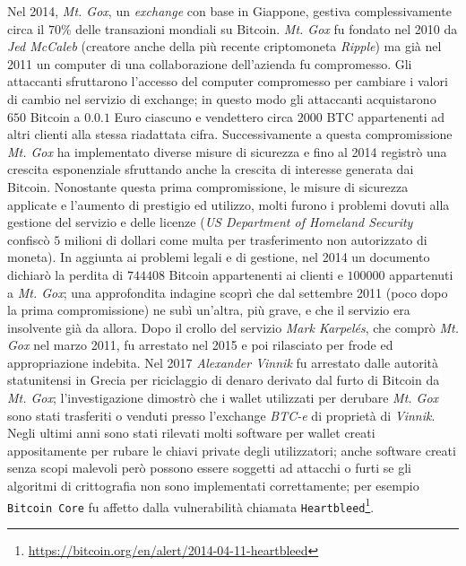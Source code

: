 Nel 2014, \textit{Mt. Gox}, un \textit{exchange} con base in Giappone, gestiva complessivamente circa il $70\%$ delle transazioni mondiali su Bitcoin. \textit{Mt. Gox} fu fondato nel 2010 da \textit{Jed McCaleb} (creatore anche della più recente criptomoneta \textit{Ripple}) ma già nel 2011 un computer di una collaborazione dell'azienda fu compromesso. Gli attaccanti sfruttarono l'accesso del computer compromesso per cambiare i valori di cambio nel servizio di exchange; in questo modo gli attaccanti acquistarono $650$ Bitcoin a $0.0.1$ Euro ciascuno e vendettero circa $2000$ BTC appartenenti ad altri clienti alla stessa riadattata cifra.\newline
Successivamente a questa compromissione \textit{Mt. Gox} ha implementato diverse misure di sicurezza e fino al 2014 registrò una crescita esponenziale sfruttando anche la crescita di interesse generata dai Bitcoin. Nonostante questa prima compromissione, le misure di sicurezza applicate e l'aumento di prestigio ed utilizzo, molti furono i problemi dovuti alla gestione del servizio e delle licenze (\textit{US Department of Homeland Security} confiscò $5$ milioni di dollari come multa per trasferimento non autorizzato di moneta). In aggiunta ai problemi legali e di gestione, nel 2014 un documento dichiarò la perdita di $744408$ Bitcoin appartenenti ai clienti e $100000$ appartenuti a \textit{Mt. Gox}; una approfondita indagine scoprì che dal settembre 2011 (poco dopo la prima compromissione) ne subì un'altra, più grave, e che il servizio era insolvente già da allora. Dopo il crollo del servizio \textit{Mark Karpelés}, che comprò \textit{Mt. Gox} nel marzo 2011, fu arrestato nel 2015 e poi rilasciato per frode ed appropriazione indebita. Nel 2017 \textit{Alexander Vinnik} fu arrestato dalle autorità statunitensi in Grecia per riciclaggio di denaro derivato dal furto di Bitcoin da \textit{Mt. Gox}; l'investigazione dimostrò che i wallet utilizzati per derubare \textit{Mt. Gox} sono stati trasferiti o venduti presso l'exchange \textit{BTC-e} di proprietà di \textit{Vinnik}.\newline
Negli ultimi anni sono stati rilevati molti software per wallet creati appositamente per rubare le chiavi private degli utilizzatori; anche software creati senza scopi malevoli però possono essere soggetti ad attacchi o furti se gli algoritmi di crittografia non sono implementati correttamente; per esempio \texttt{Bitcoin Core} fu affetto dalla vulnerabilità chiamata \texttt{Heartbleed}\footnote{\url{https://bitcoin.org/en/alert/2014-04-11-heartbleed}}.\newline\newline
